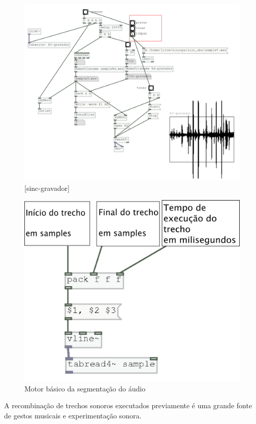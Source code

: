 \documentclass[draft]{ppgmus}
\begin{document}
\begin{figure}
\includegraphics[scale=.6]{sinc-gravador}
\caption{[sinc-gravador]}
\label{sinc-gravador}
\end{figure}

\begin{figure}
\includegraphics[scale=.6]{slice-motor}
\caption{Motor básico da segmentação do áudio}
\label{slice-motor}
\end{figure}

A recombinação de trechos sonoros executados previamente é uma grande fonte
de gestos musicais e experimentação sonora.
\end{document}

